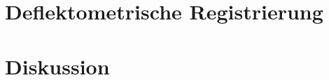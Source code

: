 {
	\FloatBarrier
    \section{Deflektometrische Registrierung}
    \label{sec:ergebnisseDeflektometrischeRegistrierung}
    
}

{
	\FloatBarrier
    \section{Diskussion}
    \label{sec:diskussion}
    
}